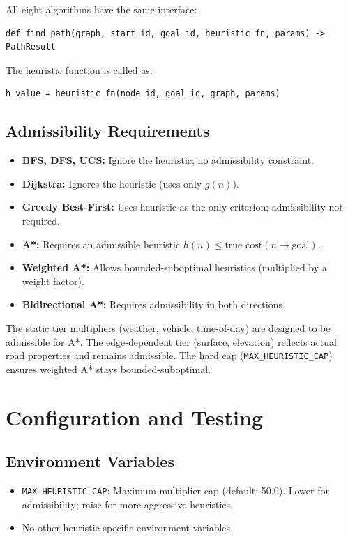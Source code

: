 \documentclass[12pt,a4paper]{article}
\begin{document}
All eight algorithms have the same interface:

\begin{lstlisting}
def find_path(graph, start_id, goal_id, heuristic_fn, params) -> PathResult
\end{lstlisting}

The heuristic function is called as:

\begin{lstlisting}
h_value = heuristic_fn(node_id, goal_id, graph, params)
\end{lstlisting}

\subsection{Admissibility Requirements}

\begin{itemize}
  \item \textbf{BFS, DFS, UCS:} Ignore the heuristic; no admissibility constraint.
  \item \textbf{Dijkstra:} Ignores the heuristic (uses only $g(n)$).
  \item \textbf{Greedy Best-First:} Uses heuristic as the only criterion; admissibility not required.
  \item \textbf{A*:} Requires an admissible heuristic $h(n) \leq \text{true cost}(n \to \text{goal})$.
  \item \textbf{Weighted A*:} Allows bounded-suboptimal heuristics (multiplied by a weight factor).
  \item \textbf{Bidirectional A*:} Requires admissibility in both directions.
\end{itemize}

The static tier multipliers (weather, vehicle, time-of-day) are designed to be admissible for A*. The edge-dependent tier (surface, elevation) reflects actual road properties and remains admissible. The hard cap (\texttt{MAX\_HEURISTIC\_CAP}) ensures weighted A* stays bounded-suboptimal.

\section{Configuration and Testing}

\subsection{Environment Variables}

\begin{itemize}
  \item \texttt{MAX\_HEURISTIC\_CAP}: Maximum multiplier cap (default: 50.0). Lower for admissibility; raise for more aggressive heuristics.
  \item No other heuristic-specific environment variables.
\end{itemize}
\end{document}
